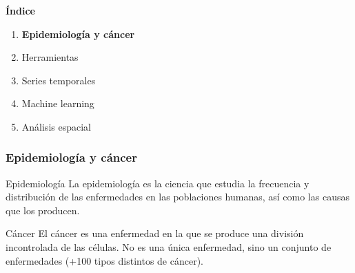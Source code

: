 \documentclass{beamer}
\begin{document}

\begin{frame}\frametitle{}	
	\Large{\textbf{Índice}}\\[2ex]
	\normalsize
	\begin{enumerate}
		\item \textbf{Epidemiología y cáncer}\\[2ex]
		\item Herramientas\\[2ex]
		\item Series temporales \\[2ex]
		\item Machine learning  \\[2ex]
		\item Análisis espacial \\[2ex]
	\end{enumerate}
\end{frame}


\begin{frame}\frametitle{Epidemiología y cáncer}
	\begin{block}{Epidemiología}
		La epidemiología es la ciencia que estudia la frecuencia y distribución de las enfermedades en las poblaciones humanas, así como las causas que los producen.
	\end{block}

	\begin{block}{Cáncer}
		El cáncer es una enfermedad en la que se produce una división incontrolada de las células. No es una única enfermedad, sino un conjunto de enfermedades (+100 tipos distintos de cáncer).
	\end{block}
\end{frame}


\end{document}
